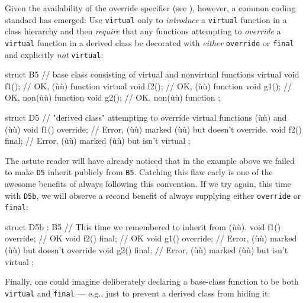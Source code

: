 {{Given the availability of the override specifier (see
), however, a common coding
standard has emerged: Use \lstinline!virtual! only to \emph{introduce} a
\lstinline!virtual! function in a class hierarchy and then \emph{require}
that any functions attempting to \emph{override} a \lstinline!virtual!
function in a derived class be decorated with \emph{either}
\lstinline!override! or \lstinline!final! and explicitly \emph{not}
\lstinline!virtual!:

\begin{emcppslisting}
struct B5  // base class consisting of virtual and nonvirtual functions
{
    virtual void f1();  // OK, (ù{}ù) function
    virtual void f2();  // OK, (ù{}ù) function
            void g1();  // OK, non(ù{}ù) function
            void g2();  // OK, non(ù{}ù) function
};

struct D5  // "derived class" attempting to override virtual functions (ù{}ù) and (ù{}ù)
{
    void f1() override;  // Error, (ù{}ù) marked (ù{}ù) but doesn't override.
    void f2() final;     // Error, (ù{}ù) marked (ù{}ù) but isn't virtual
};
\end{emcppslisting}
    

\noindent The astute reader will have already noticed that in the example above we
failed to make \lstinline!D5! inherit publicly from \lstinline!B5!. Catching
this flaw early is one of the awesome benefits of always following this
convention. If we try again, this time with \lstinline!D5b!, we will
observe a second benefit of always supplying either \lstinline!override! or
\lstinline!final!:

\begin{emcppslisting}
struct D5b : B5  // This time we remembered to inherit from (ù{}ù).
{
    void f1() override;  // OK
    void f2() final;     // OK
    void g1() override;  // Error, (ù{}ù) marked (ù{}ù) but doesn't override
    void g2() final;     // Error, (ù{}ù) marked (ù{}ù) but isn't virtual
};
\end{emcppslisting}
    

\noindent Finally, one could imagine deliberately declaring a base-class function
to be both \lstinline!virtual! and \lstinline!final! --- e.g., just to prevent
a derived class from hiding it:

}}
